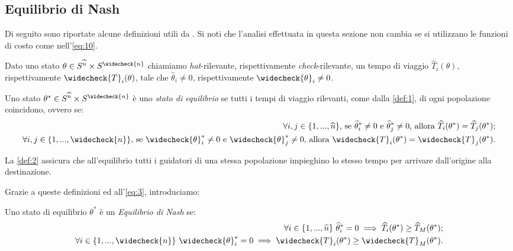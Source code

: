 \subsection{Equilibrio di Nash}
\label{subsec:EqNash}

Di seguito sono riportate alcune definizioni utili da \cite{MR4911797}. Si noti che l'analisi effettuata in questa sezione non cambia se si utilizzano le funzioni di costo come nell'\autoref{eq:10}.
\begin{definition}\label{def:1}
    Dato uno stato $\theta\in S^{\widehat{n}}\times S^{\widecheck{n}}$ chiamiamo \textit{hat}-rilevante, rispettivamente
    \textit{check}-rilevante, un tempo di viaggio $\widehat{T}_i(\theta)$, rispettivamente $\widecheck{T}_i(\theta)$, tale 
    che $\widehat{\theta}_i\neq 0$, rispettivamente $\widecheck{\theta}_i\neq 0$.
\end{definition}

\begin{definition}\label{def:2}
    Uno stato $\theta^{*}\in S^{\widehat{n}}\times S^{\widecheck{n}}$ è uno \textit{stato di equilibrio}
    se tutti i tempi di viaggio rilevanti, come dalla \autoref{def:1}, di ogni popolazione coincidono, ovvero se:
    \begin{equation*}
        \begin{split}
        \forall i,j\in\{1,...,\widehat{n}\} \text{, se }\widehat{\theta}_i^{*}\neq 0 \text{ e }\widehat{\theta}_j^{*}\neq 0
        \text{, allora }\widehat{T}_i(\theta^{*})=\widehat{T}_j(\theta^{*});\\
        \forall i,j\in\{1,...,\widecheck{n}\} \text{, se }\widecheck{\theta}_i^{*}\neq 0 \text{ e }\widecheck{\theta}_j^{*}\neq 0
        \text{, allora }\widecheck{T}_i(\theta^{*})=\widecheck{T}_j(\theta^{*}).
        \end{split}
    \end{equation*}
\end{definition}

La \autoref{def:2} assicura che all'equilibrio tutti i guidatori di una stessa popolazione impieghino lo stesso tempo per
arrivare dall'origine alla destinazione.

Grazie a queste definizioni ed all'\autoref{eq:3}, introduciamo:

\begin{definition}\label{def:3}
    Uno stato di equilibrio $\theta^{*}$ è un \textit{Equilibrio di Nash} se:
    \begin{equation*}
        \begin{split}
        \forall i\in\{1,...,\widehat{n}\}\text{ }\widehat{\theta}_i^{*}=0\implies\widehat{T}_i(\theta^*)\geq\widehat{T}_M(\theta^*);\\
        \forall i\in\{1,...,\widecheck{n}\}\text{ }\widecheck{\theta}_i^{*}=0\implies\widecheck{T}_i(\theta^*)\geq\widecheck{T}_M(\theta^*).
        \end{split}
    \end{equation*}
\end{definition}

